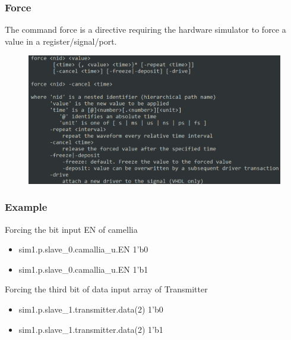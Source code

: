 \documentclass{beamer}
\begin{document}
\begin{frame}

\frametitle{Force}

The command force is a directive requiring the hardware simulator to force a value 
in a register/signal/port.

\begin{figure}
	\centering
	\includegraphics[width=0.9\columnwidth]{figures/force_cmd.png}
\end{figure}

\end{frame}

\begin{frame}

\frametitle{Example}

Forcing the bit input EN of camellia
\begin{itemize}
\item 
sim1.p.slave\_0.camallia\_u.EN 1'b0
\item
sim1.p.slave\_0.camallia\_u.EN 1'b1
\end{itemize}

Forcing the third bit of data input array of Transmitter
\begin{itemize}
\item 
sim1.p.slave\_1.transmitter.data(2) 1'b0
\item
sim1.p.slave\_1.transmitter.data(2) 1'b1
\end{itemize}

\end{frame}
\end{document}
